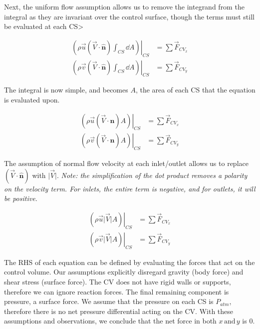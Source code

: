 \documentclass[../main.tex]{subfiles}
\begin{document}
Next, the uniform flow assumption allows us to remove the integrand from the integral as they are invariant over the control surface, though the terms must still be evaluated at each CS>

\begin{align*}
    \left. \left( \rho \vec{u} \left({\vec{V} \cdot \hat{\mathbf{n}}}\right) \int_{CS} \dd A \right) \right|_{CS} &=%
    \sum{\vec{F}_{CV_x}}\\
    \left. \left( \rho \vec{v} \left({\vec{V} \cdot \hat{\mathbf{n}}}\right) \int_{CS}  \dd A \right) \right|_{CS} &=%
    \sum{\vec{F}_{CV_y}}
\end{align*}

The integral is now simple, and becomes \(A\), the area of each CS that the equation is evaluated upon.

\begin{align*}
    \left. \left( \rho \vec{u} \left({\vec{V} \cdot \hat{\mathbf{n}}}\right) A \right) \right|_{CS} &=%
    \sum{\vec{F}_{CV_x}}\\
    \left. \left( \rho \vec{v} \left({\vec{V} \cdot \hat{\mathbf{n}}}\right) A \right) \right|_{CS} &=%
    \sum{\vec{F}_{CV_y}}
\end{align*}

The assumption of normal flow velocity at each inlet/outlet allows us to replace \(\left({\vec{V} \cdot \hat{\mathbf{n}}}\right)\) with \(\lvert\vec{V}\rvert\).
\textit{Note: the simplification of the dot product removes a polarity on the velocity term. For inlets, the entire term is negative, and for outlets, it will be positive.}

\begin{align*}
    \left. \left( \rho \vec{u} \lvert\vec{V}\rvert  A \right) \right|_{CS} &=%
    \sum{\vec{F}_{CV_x}}\\
    \left. \left( \rho \vec{v} \lvert\vec{V}\rvert  A \right) \right|_{CS} &=%
    \sum{\vec{F}_{CV_y}}
\end{align*}

The RHS of each equation can be defined by evaluating the forces that act on the control volume.
Our assumptions explicitly disregard gravity (body force) and shear stress (surface force).
The CV does not have rigid walls or supports, therefore we can ignore reaction forces.
The final remaining component is pressure, a surface force.
We assume that the pressure on each CS is \(P_{atm}\), therefore there is no net pressure differential acting on the CV.
With these assumptions and observations, we conclude that the net force in both \(x \, \textrm{and} \, y\) is 0.
\end{document}
